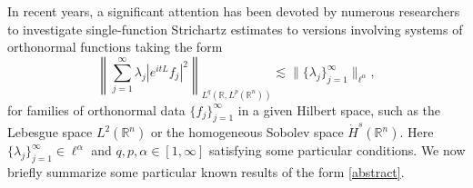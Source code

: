\documentclass[a4paper,11pt, reqno]{amsart}
\numberwithin{equation}{section}
\theoremstyle{plain}
\theoremstyle{definition}
\theoremstyle{remark}
\begin{document}
	In recent years, a significant attention has been devoted by numerous researchers to investigate  single-function Strichartz estimates   to versions involving systems of orthonormal functions taking the form
    \begin{equation}\label{abstract}
		\left\|\sum_{j=1}^\infty\lambda_j|e^{itL}f_j|^2\right\|_{L^q(\mathbb{R},L^p(\mathbb{R}^n))} \lesssim \|\{\lambda_j\}_{j=1}^\infty\|_{\ell^{\alpha}},
	\end{equation}
	for families of orthonormal data  $\{f_j\}_{j=1}^\infty$ in a given Hilbert space, such as the Lebesgue space $L^2(\mathbb{R}^n)$ or the homogeneous Sobolev space $\dot{H}^s(\mathbb{R}^n)$. Here  $\{\lambda_j\}_{j=1}^\infty \in \ell^{\alpha}$  and $ q, p, \alpha \in [1, \infty]$ satisfying some particular
	conditions. We now briefly summarize some particular known results of the form \eqref{abstract}.
\end{document}
